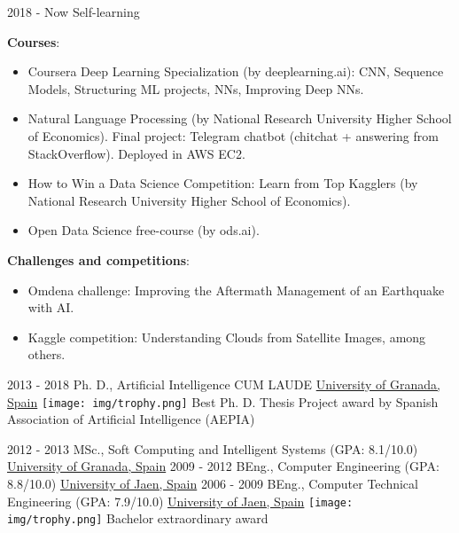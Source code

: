 \documentclass[letterpaper]{twentysecondcv} %
\begin{document}
\begin{twenty} %
	\twentyitem
    	{2018 - Now}
        {}
        {Self-learning}
        {}
        {\textbf{Courses}: \begin{itemize}
        	\item Coursera Deep Learning Specialization (by deeplearning.ai): CNN, Sequence Models, Structuring ML projects, NNs, Improving Deep NNs.
			\item Natural Language Processing (by National Research University Higher School of Economics). Final project: Telegram chatbot (chitchat + answering from StackOverflow). Deployed in AWS EC2.  
			\item How to Win a Data Science Competition: Learn from Top Kagglers (by National Research University Higher School of Economics).
			\item Open Data Science free-course (by ods.ai).
        \end{itemize}}
        {\textbf{Challenges and competitions}:
        	\begin{itemize}
        		\item Omdena challenge: Improving the Aftermath Management of an Earthquake with AI.
        		\item Kaggle competition: Understanding Clouds from Satellite Images, among others.
        	\end{itemize}
        }
       
	\twentyitem
    	{2013 - 2018}
        {}
        {Ph. D., Artificial Intelligence \textnormal{CUM LAUDE}}
        {\href{http://www.ugr.es/}{University of Granada, Spain}}
        {{\texttt{[image: img/trophy.png]}} Best Ph. D. Thesis Project award by Spanish Association of
Artificial Intelligence (AEPIA)}
        {}
	
	\twentyitem
    	{2012 - 2013}
        {}
        {MSc., Soft Computing and Intelligent Systems \textnormal{(GPA: 8.1/10.0)}}
        {\href{http://www.ugr.es/}{University of Granada, Spain}}
        {}
        {}
	\twentyitem
    	{2009 - 2012}
		{}
        {BEng., Computer Engineering \textnormal{(GPA: 8.8/10.0)}}
        {\href{http://www.ujaen.es/}{University of Jaen, Spain}}
        {}
        {}
   \twentyitem
    	{2006 - 2009}
		{}
        {BEng., Computer Technical Engineering \textnormal{(GPA: 7.9/10.0)}}
        {\href{http://www.ujaen.es/}{University of Jaen, Spain}}
        {{\texttt{[image: img/trophy.png]}} Bachelor extraordinary award}
        {}
\end{twenty}
\end{document}

